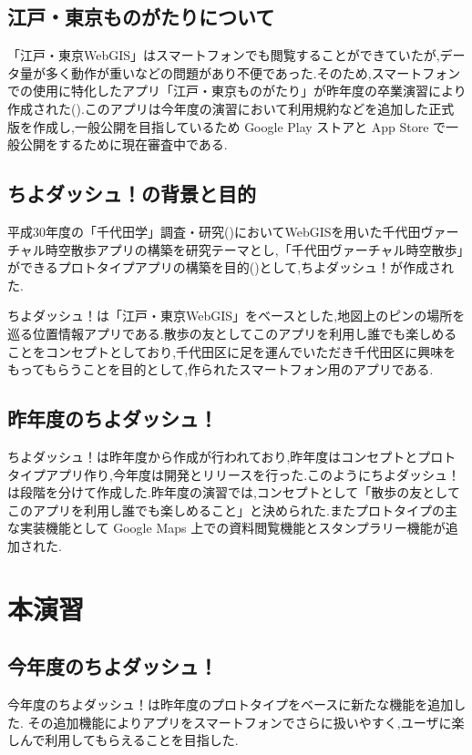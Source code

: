 \documentclass[a4paper, twoside]{jarticle}
\begin{document}
\begin{multicols}{2}
\subsection{江戸・東京ものがたりについて}
「江戸・東京WebGIS」はスマートフォンでも閲覧することができていたが,データ量が多く動作が重いなどの問題があり不便であった.そのため,スマートフォンでの使用に特化したアプリ「江戸・東京ものがたり」が昨年度の卒業演習により作成された(\cite{houkokusyo_30}).このアプリは今年度の演習において利用規約などを追加した正式版を作成し,一般公開を目指しているため Google Play ストアと App Store で一般公開をするために現在審査中である.

\subsection{ちよダッシュ！の背景と目的}
平成30年度の「千代田学」調査・研究(\cite{tiyokenkyu})においてWebGISを用いた千代田ヴァーチャル時空散歩アプリの構築を研究テーマとし,「千代田ヴァーチャル時空散歩」ができるプロトタイプアプリの構築を目的(\cite{tiyodagaku_houkokusyo})として,ちよダッシュ！が作成された.

ちよダッシュ！は「江戸・東京WebGIS」をベースとした,地図上のピンの場所を巡る位置情報アプリである.散歩の友としてこのアプリを利用し誰でも楽しめることをコンセプトとしており,千代田区に足を運んでいただき千代田区に興味をもってもらうことを目的として,作られたスマートフォン用のアプリである.

\subsection{昨年度のちよダッシュ！}
ちよダッシュ！は昨年度から作成が行われており,昨年度はコンセプトとプロトタイプアプリ作り,今年度は開発とリリースを行った.このようにちよダッシュ！は段階を分けて作成した.昨年度の演習では,コンセプトとして「散歩の友としてこのアプリを利用し誰でも楽しめること」と決められた.またプロトタイプの主な実装機能として Google Maps 上での資料閲覧機能とスタンプラリー機能が追加された.


\section{本演習}

\subsection{今年度のちよダッシュ！}
今年度のちよダッシュ！は昨年度のプロトタイプをベースに新たな機能を追加した.
その追加機能によりアプリをスマートフォンでさらに扱いやすく,ユーザに楽しんで利用してもらえることを目指した.


\end{multicols}
\end{document}
